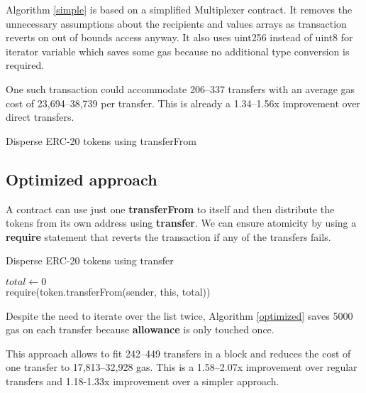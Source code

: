 \documentclass[12pt]{article}
\begin{document}
Algorithm \ref{simple} is based on a simplified Multiplexer contract\cite{multiplexer}.
It removes the unnecessary assumptions about the recipients and values arrays as transaction reverts on out of bounds access anyway\cite{solidity-errors}.
It also uses uint256 instead of uint8 for iterator variable which saves some gas because no additional type conversion is required.

One such transaction could accommodate 206--337 transfers with an average gas cost of 23,694--38,739 per transfer. 
This is already a 1.34--1.56x improvement over direct transfers.

\begin{algorithm}[h]
\label{simple}
\caption{Disperse ERC-20 tokens using transferFrom}
\BlankLine
\For{$i \in [0 \dots \text{recipients.length})$}{
	require(token.transferFrom(sender, recipients[i], values[i]))
}
\end{algorithm}

\subsection{Optimized approach}

A contract can use just one \textbf{transferFrom} to itself and then distribute the tokens from its own address using \textbf{transfer}. We can ensure atomicity by using a \textbf{require} statement that reverts the transaction if any of the transfers fails.

\begin{algorithm}[h]
	\label{optimized}
	\caption{Disperse ERC-20 tokens using transfer}
	\BlankLine
	$total \leftarrow 0$ \\
	\For{$i \in [0 \dots recipients.length)$}{
		$total \leftarrow total + values[i]$
	}
	require(token.transferFrom(sender, this, total)) \\
	\For{$i \in [0 \dots recipients.length)$}{
		require(token.transfer(this, recipients[i], values[i]))
	}
\end{algorithm}

Despite the need to iterate over the list twice, Algorithm \ref{optimized} saves 5000 gas on each transfer because \textbf{allowance} is only touched once.

This approach allows to fit 242--449 transfers in a block and reduces the cost of one transfer to 17,813--32,928 gas.
This is a 1.58--2.07x improvement over regular transfers and 1.18-1.33x improvement over a simpler approach.
\end{document}
